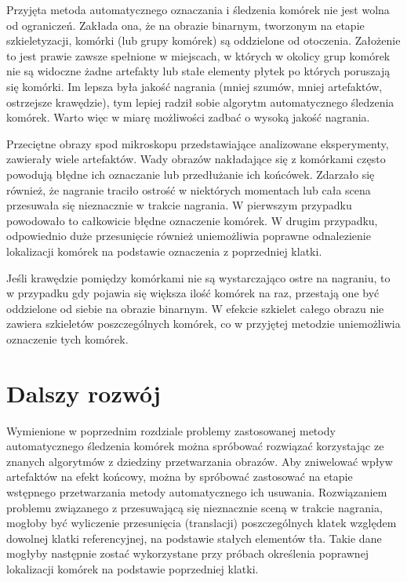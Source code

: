 \documentclass[declaration,shortabstract,mgr]{iithesis}
\begin{document}
Przyjęta metoda automatycznego oznaczania i śledzenia komórek nie jest wolna od ograniczeń.
Zakłada ona, że na obrazie binarnym, tworzonym na etapie szkieletyzacji, komórki (lub grupy komórek) są oddzielone od otoczenia.
Założenie to jest prawie zawsze spełnione w miejscach, w których w okolicy grup komórek nie są widoczne żadne artefakty lub stałe elementy płytek po których poruszają się komórki.
Im lepsza była jakość nagrania (mniej szumów, mniej artefaktów, ostrzejsze krawędzie), tym lepiej radził sobie algorytm automatycznego śledzenia komórek.
Warto więc w miarę możliwości zadbać o wysoką jakość nagrania.

Przeciętne obrazy spod mikroskopu przedstawiające analizowane eksperymenty, zawierały wiele artefaktów.
Wady obrazów nakładające się z komórkami często powodują błędne ich oznaczanie lub przedłużanie ich końcówek.
Zdarzało się również, że nagranie traciło ostrość w niektórych momentach lub cała scena przesuwała się nieznacznie w trakcie nagrania.
W pierwszym przypadku powodowało to całkowicie błędne oznaczenie komórek.
W drugim przypadku, odpowiednio duże przesunięcie również uniemożliwia poprawne odnalezienie lokalizacji komórek na podstawie oznaczenia z poprzedniej klatki.

Jeśli krawędzie pomiędzy komórkami nie są wystarczająco ostre na nagraniu, to w przypadku gdy pojawia się większa ilość komórek na raz, przestają one być oddzielone od siebie na obrazie binarnym.
W efekcie szkielet całego obrazu nie zawiera szkieletów poszczególnych komórek, co w przyjętej metodzie uniemożliwia oznaczenie tych komórek.

\section{Dalszy rozwój}

Wymienione w poprzednim rozdziale problemy zastosowanej metody automatycznego śledzenia komórek można spróbować rozwiązać korzystając ze znanych algorytmów z dziedziny przetwarzania obrazów.
Aby zniwelować wpływ artefaktów na efekt końcowy, można by spróbować zastosować na etapie wstępnego przetwarzania metody automatycznego ich usuwania\cite{paper:removing-artifacts}.
Rozwiązaniem problemu związanego z przesuwającą się nieznacznie sceną w trakcie nagrania, mogłoby być wyliczenie przesunięcia (translacji) poszczególnych klatek względem dowolnej klatki referencyjnej, na podstawie stałych elementów tła.
Takie dane mogłyby następnie zostać wykorzystane przy próbach określenia poprawnej lokalizacji komórek na podstawie poprzedniej klatki.
\end{document}
